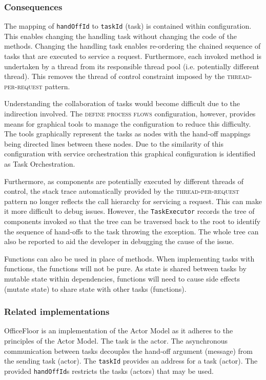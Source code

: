 \documentclass[prodmode]{style/acmlarge}
\begin{document}
\subsubsection*{Consequences}

The mapping of \texttt{handOffId} to \texttt{taskId} (task) is contained within
configuration.  This enables changing the handling task without changing the
code of the methods.  Changing the handling task enables re-ordering the chained
sequence of tasks that are executed to service a request.  Furthermore, each
invoked method is undertaken by a thread from its responsible thread pool (i.e.
potentially different thread).  This removes the thread of control constraint
imposed by the \textsc{thread-per-request} pattern.

Understanding the collaboration of tasks would become difficult due to the
indirection involved.  The \textsc{define process flows} configuration, however,
provides means for graphical tools to manage the configuration to reduce this
difficulty.  The tools graphically represent the tasks as nodes with the
hand-off mappings being directed lines between these nodes.  Due to the
similarity of this configuration with service orchestration this graphical
configuration is identified as Task Orchestration.

Furthermore, as components are potentially executed by different threads of
control, the stack trace automatically provided by the
\textsc{thread-per-request} pattern no longer reflects the call hierarchy for
servicing a request.  This can make it more difficult to debug issues.  However,
the \texttt{TaskExecutor} records the tree of components invoked so that the
tree can be traversed back to the root to identify the sequence of hand-offs to
the task throwing the exception.  The whole tree can also be reported to aid the
developer in debugging the cause of the issue.

Functions can also be used in place of methods.  When implementing tasks with
functions, the functions will not be pure.  As state is shared between tasks by
mutable state within dependencies, functions will need to cause side effects
(mutate state) to share state with other tasks (functions).



\subsubsection*{Related implementations}

OfficeFloor is an implementation of the Actor Model \cite{actors} as it adheres
to the principles of the Actor Model.  The task is the actor.  The asynchronous
communication between tasks decouples the hand-off argument (message) from the
sending task (actor).  The \texttt{taskId} provides an address for a task
(actor).  The provided \texttt{handOffId}s restricts the tasks (actors) that may
be used.
\end{document}
